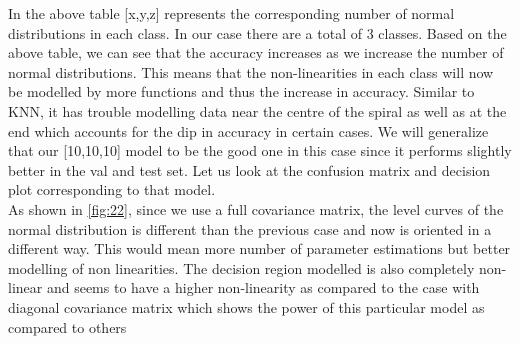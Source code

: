 In the above table [x,y,z] represents the corresponding number of normal distributions in each class. In our case there are a total of 3 classes. Based on the above table, we can see that the accuracy increases as we increase the number of normal distributions. This means that the non-linearities in each class will now be modelled by more functions and thus the increase in accuracy. Similar to KNN, it has trouble modelling data near the centre of the spiral as well as at the end which accounts for the dip in accuracy in certain cases. We will generalize that our [10,10,10] model to be the good one in this case since it performs slightly better in the val and test set. Let us look at the confusion matrix and decision plot corresponding to that model. \\

As shown in \ref{fig:22}, since we use a full covariance matrix, the level curves of the normal distribution is different than the previous case and now is oriented in a different way. This would mean more number of parameter estimations but better modelling of non linearities. The decision region modelled is also completely non-linear and seems to have a higher non-linearity as compared to the case with diagonal covariance matrix which shows the power of this particular model as compared to others

